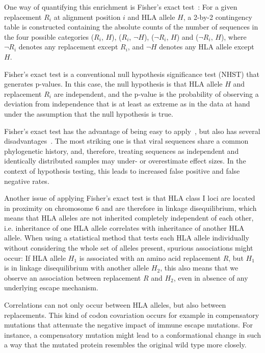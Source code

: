 \documentclass[fleqn,11pt]{SelfArx} %
\begin{document}
One way of quantifying this enrichment is Fisher's exact test~\cite{Fisher1922}: For a given replacement \(R_{i}\) at alignment position \(i\) and HLA allele \(H\), a 2-by-2 contingency table is constructed containing the absolute counts of the number of sequences in the four possible categories  (\(R_{i}\), \(H\)), (\(R_{i}\), \(\neg H\)), (\(\neg R_{i}\), \(H\)) and (\(\neg R_{i}\), \(H\)), where \(\neg R_{i}\) denotes any replacement except \(R_{i}\), and \(\neg H\) denotes any HLA allele except \(H\).

Fisher's exact test is a conventional null hypothesis significance test (NHST) that generates p-values. In this case, the null hypothesis is that HLA allele \(H\) and  replacement \(R_{i}\) are independent, and the p-value is the probability of observing a deviation from independence that is at least as extreme as in the data at hand under the assumption that the null hypothesis is true.

Fisher's exact test has the advantage of being easy to apply~\cite{Budeus2016},  but also has several disadvantages~\cite{Carlson2008}. The most striking one is that viral sequences share a common phylogenetic history, and,  therefore, treating sequences as independent and identically distributed samples may under- or overestimate effect sizes. In the context of hypothesis testing, this leads to increased false positive and false negative rates. 

Another issue of applying Fisher's exact test is that HLA class I loci are located in proximity on chromosome 6 and are therefore in linkage disequilibrium, which means that HLA alleles are not inherited completely independent of each other, i.e. inheritance of one HLA allele correlates with inheritance of another HLA allele. When using a statistical method that tests each HLA allele individually without considering the whole set of alleles present, spurious associations might occur: If HLA allele \(H_{1}\) is associated with an amino acid replacement \(R\), but \(H_{1}\) is in linkage disequilibrium with another allele \(H_{2}\), this also means that we observe an association between replacement \(R\) and \(H_{2}\), even in absence of any underlying escape mechanism.

Correlations can not only occur between HLA alleles, but also between replacements. This kind of codon covariation occurs for example in compensatory mutations that attenuate the negative impact of immune escape mutations. For instance, a compensatory mutation might lead to a conformational change in such a way that the mutated protein resembles the original wild type more closely.
\end{document}

